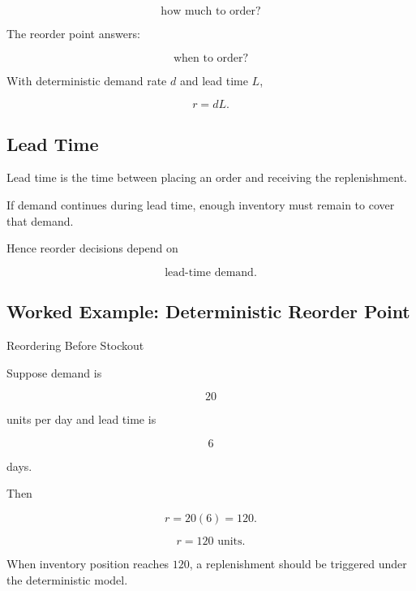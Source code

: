 \[
\boxed{
\text{how much to order?}
}
\]

The reorder point answers:

\[
\boxed{
\text{when to order?}
}
\]

With deterministic demand rate \(d\) and lead time \(L\),

\[
\boxed{
r
=
dL.
}
\]

\subsection{Lead Time}
\label{subsec:inventory-lead-time}

Lead time is the time between placing an order and receiving the
replenishment.

If demand continues during lead time, enough inventory must remain to
cover that demand.

Hence reorder decisions depend on

\[
\boxed{
\text{lead-time demand}.
}
\]

\subsection{Worked Example: Deterministic Reorder Point}
\label{subsec:worked-deterministic-reorder-point}

\begin{workedexamplebox}{Reordering Before Stockout}

Suppose demand is

\[
20
\]

units per day and lead time is

\[
6
\]

days.

Then

\[
r
=
20(6)
=
120.
\]

\begin{answerbox}
\[
\boxed{
r=120\text{ units}.
}
\]
\end{answerbox}

When inventory position reaches \(120\), a replenishment should be
triggered under the deterministic model.

\end{workedexamplebox}

